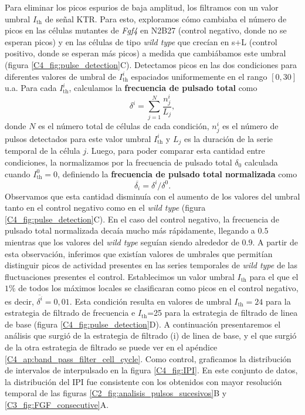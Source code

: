\documentclass[./main.tex]{subfiles}
\begin{document}
Para eliminar los picos espurios de baja amplitud, los filtramos con un valor umbral $I_{\text{th}}$ de señal KTR. Para esto, exploramos cómo cambiaba el número de picos en las células mutantes de \textit{Fgf4} en N2B27 (control negativo, donde no se esperan picos) y en las células de tipo \textit{wild type} que crecían en s+L (control positivo, donde se esperan más picos) a medida que cambiábamos este umbral (figura \ref{C4_fig:pulse_detection}C). Detectamos picos en las dos condiciones para diferentes valores de umbral de $I_{\text{th}}^i$ espaciados uniformemente en el rango $[0, 30] $u.a. Para cada $I_{\text{th}}^i$, calculamos la \textbf{frecuencia de pulsado total} como
\begin{equation}
    \delta^i = \sum_{j=1}^N \frac{n_j^i}{L_j},
\end{equation}
donde $N$ es el número total de células de cada condición, $n_j^i$ es el número de pulsos detectados para este valor umbral $I_{\text{th}}^i$ y $L_j$ es la duración de la serie temporal de la célula $j$. Luego, para poder comparar esta cantidad entre condiciones, la normalizamos por la frecuencia de pulsado total $\delta_0$ calculada cuando $I_{\text{th}}^0=0$, definiendo la \textbf{frecuencia de pulsado total normalizada} como 
\begin{equation}
     \overline{\delta_i} =  \delta^i / \delta^0.
\end{equation}
Observamos que esta cantidad disminuía con el aumento de los valores del umbral tanto en el control negativo como en el \textit{wild type} (figura \ref{C4_fig:pulse_detection}C). En el caso del control negativo, la frecuencia de pulsado total normalizada decaía mucho más rápidamente, llegando a $0.5$ mientras que los valores del \textit{wild type} seguían siendo alrededor de $0.9$. A partir de esta observación, inferimos que existían valores de umbrales que permitían distinguir picos de actividad presentes en las series temporales de \textit{wild type} de las fluctuaciones presentes el control. Establecimos un valor umbral $I_{\text{th}}$ para el que el $1 \%$ de todos los máximos locales se clasificaran como picos en el control negativo, es decir, $\overline{\delta^i}=0,01$. Esta condición resulta en valores de umbral $I_{\text{th}}=24$ para la estrategia de filtrado de frecuencia e $I_{\text{th}}$=25 para la estrategia de filtrado de linea de base (figura \ref{C4_fig:pulse_detection}D). A continuación presentaremos el análisis que surgió de la estrategia de filtrado (i) de linea de base, y el que surgió de la otra estrategia de filtrado se puede ver en el apéndice \ref{C4_ap:band_pass_filter_cell_cycle}. Como control, graficamos la distribución de intervalos de interpulsado en la figura \ref{C4_fig:IPI}. En este conjunto de datos, la distribución del IPI fue consistente con los obtenidos con mayor resolución temporal de las figuras \ref{C2_fig:analisis_pulsos_sucesivos}B y \ref{C3_fig:FGF_consecutive}A. 
\end{document}
